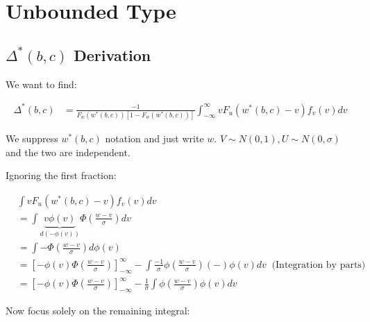 \documentclass{article}
\begin{document}
\section*{Unbounded Type}

\subsection*{$\Delta^*(b,c)$ Derivation}
We want to find:

\begin{align*}
    \Delta^*(b,c) &= \frac{
        -1
    }{
        F_w(w^*(b,c)) [1 - F_w(w^*(b,c))]
    } \int^\infty_{-\infty} vF_u(w^*(b,c) - v) f_v(v) dv
\end{align*}

We suppress $w^*(b,c)$ notation and just write $w$. $V \sim N(0, 1), U \sim N(0, \sigma)$ 
and the two are independent.


Ignoring the first fraction:

\begin{align*}
    &\int vF_u(w^*(b,c) - v) f_v(v) dv \\
    &= 
    \int \underbrace{v \phi(v)}_{d(-\phi(v))} \Phi\left(\frac{w-v}{\sigma}\right) dv \\
    &= \int - \Phi\left(\frac{w-v}{\sigma}\right) d \phi(v) \\
    &= \left[
        -\phi(v) \Phi\left(\frac{w-v}{\sigma}\right) 
    \right]^\infty_{-\infty} - \int \frac{-1}{\sigma}\phi\left(\frac{w - v}{\sigma}\right) (-) \phi(v) dv \ \text{ (Integration by parts)} \\ 
    &= \left[
        -\phi(v) \Phi\left(\frac{w-v}{\sigma}\right) 
    \right]^\infty_{-\infty} -\frac{1}{\sigma} \int \phi\left(\frac{w - v}{\sigma}\right) \phi(v) dv 
\end{align*}


Now focus solely on the remaining integral:
\end{document}
